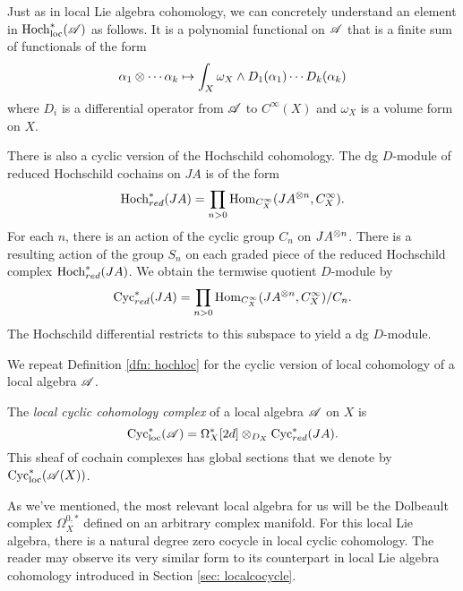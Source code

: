 Just as in local Lie algebra cohomology, we can concretely understand an element in ${\rm Hoch}_{\rm loc}^*(\mathscr A)$ as follows.
It is a polynomial functional on $\mathscr A$ that is a finite sum of functionals of the form
\[
\alpha_1 \otimes \cdots \alpha_k \mapsto \int_X \omega_X \wedge D_1(\alpha_1) \cdots D_k(\alpha_k)
\]
where $D_i$ is a differential operator from $\mathscr A$ to $C^\infty(X)$ and $\omega_X$ is a volume form on $X$. 

There is also a cyclic version of the Hochschild cohomology. 
The dg $D$-module of reduced Hochschild cochains on $JA$ is of the form
\[
{\rm Hoch}_{red}^* (JA) = \prod_{n > 0} {\rm Hom}_{C^\infty_X} (JA^{\otimes n}, C^\infty_X) .
\]
For each $n$, there is an action of the cyclic group $C_n$ on $JA^{\otimes n}$. 
There is a resulting action of the group $S_n$ on each graded piece of the reduced Hochschild complex ${\rm Hoch}_{red}^* (JA)$.
We obtain the termwise quotient $D$-module by
\[
{\rm Cyc}_{red}^* (JA) = \prod_{n > 0} {\rm Hom}_{C^\infty_X} (JA^{\otimes n}, C^\infty_X) / C_n .
\]
The Hochschild differential restricts to this subspace to yield a dg $D$-module. 

We repeat Definition \ref{dfn: hochloc} for the cyclic version of local cohomology of a local algebra $\mathscr A$. 

\begin{dfn}\label{dfn: cycloc}
The {\em local cyclic cohomology complex}  of a local algebra $\mathscr A$ on $X$ is 
\[
{\rm Cyc}_{\rm loc}^*(\mathscr A) = \Omega^*_X[2d] \otimes_{D_X} {\rm Cyc}^*_{red} (JA) .
\] 
This sheaf of cochain complexes has global sections that we denote by ${\rm Cyc}_{\rm loc}^*(\mathscr A(X))$.
\end{dfn}

As we've mentioned, the most relevant local algebra for us will be the Dolbeault complex $\Omega^{0,*}_X$ defined on an arbitrary complex manifold. 
For this local Lie algebra, there is a natural degree zero cocycle in local cyclic cohomology.
The reader may observe its very similar form to its counterpart in local Lie algebra cohomology introduced in Section \ref{sec: localcocycle}. 

